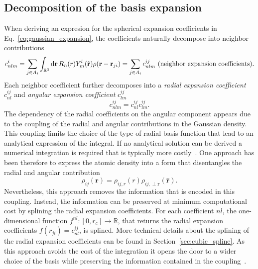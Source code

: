 \subsection{Decomposition of the basis expansion}
When deriving an expresion for the spherical expansion coefficients in Eq.~\eqref{eq:gaussian_expansion}, the coefficients naturally decompose into neighbor contributions
\begin{equation}
  \label{eq:neighbor_contr}
  c^i_{nlm} = \sum_{j\in A_i}\int_{\mathbb{R}^3}\mathrm{d}\mathbf{r}\, R_n(r)Y_m^l(\hat{\mathbf{r}})\rho(\mathbf{r}-\mathbf{r}_{ji}) = \sum_{j\in A_i}c^{ij}_{nlm} \textrm{ (neighbor expansion coefficients)}.\\
\end{equation}
Each neighbor coefficient further decomposes into a \emph{radial expansion coefficient} $c_{nl}^{ij}$ and \emph{angular expansion coefficient} $c_{lm}^{ij}$
\begin{equation}
  \label{eq:radial_expansion}
  c^{ij}_{nlm} = c_{nl}^{ij}c^{ij}_{lm}.
\end{equation}
The dependency of the radial coefficients on the angular component appears due to the coupling of the radial and angular contributions in the Gaussian density.
This coupling limits the choice of the type of radial basis function that lead to an analytical expression of the integral.
If no analytical solution can be derived a numerical integration is required that is typically more costly~\cite{musil2021efficient}.
One approach has been therefore to express the atomic density into a form that disentangles the radial and angular contribution~\cite{caro2019optimizing} 
\begin{equation}
  \rho_{ij}(\mathbf{r}) = \rho_{ij,r}(r)\rho_{ij,\perp \mathbf{r}}(\hat{\mathbf{r}}).
\end{equation}
Nevertheless, this approach removes the information that is encoded in this coupling.
Instead, the information can be preserved at minimum computational cost by splining the radial expansion coefficients.
For each coefficient $nl$, the one-dimensional function $f^{nl}:[0,r_c]\rightarrow\mathbb{R}$, that returns the radial expansion coefficients $f(r_{ji}) = c_{nl}^{ij}$, is splined.
More technical details about the splining of the radial expansion coefficients can be found in Section~\ref{sec:cubic_spline}.
As this approach avoids the cost of the integration it opens the door to a wider choice of the basis while preserving the information contained in the coupling~\cite{goscinski2021optimal,bigi2022smooth,lopanitsyna2023modeling}. 

